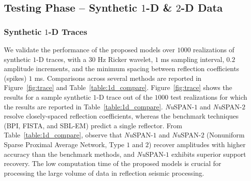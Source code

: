 \documentclass[journal]{IEEEtran}
\begin{document}
\subsection{Testing Phase -- Synthetic \texorpdfstring{$1$}{1}-D \& \texorpdfstring{$2$}{2}-D Data}
\label{results:synthetic}

\subsubsection{Synthetic \texorpdfstring{$1$}{1}-D Traces}
\label{subsubsec:results_1d}
We validate the performance of the proposed models over $1000$ realizations of synthetic $1$-D traces, with a $30$ Hz Ricker wavelet, $1$ ms sampling interval, $0.2$ amplitude increments, and the minimum spacing between reflection coefficients (spikes) $1$ ms. Comparisons across several methods are reported in Figure~\ref{fig:trace} and Table~\ref{table:1d_compare}. Figure~\ref{fig:trace} shows the results for a sample synthetic $1$-D trace out of the $1000$ test realizations for which the results are reported in Table~\ref{table:1d_compare}. {\it Nu}SPAN-$1$ and {\it Nu}SPAN-$2$ resolve closely-spaced reflection coefficients, whereas the benchmark techniques (BPI, FISTA, and SBL-EM) predict a single reflector. From Table~\ref{table:1d_compare}, observe that {\it Nu}SPAN-$1$ and {\it Nu}SPAN-$2$ (Nonuniform Sparse Proximal Average Network, Type $1$ and $2$) recover amplitudes with higher accuracy than the benchmark methods, and {\it Nu}SPAN-$1$ exhibits superior support recovery. The low computation time of the proposed models is crucial for processing the large volume of data in reflection seismic processing.
\end{document}
